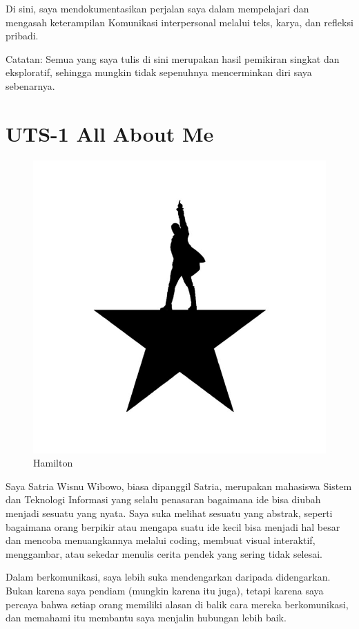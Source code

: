 \documentclass[
  letterpaper,
  DIV=11,
  numbers=noendperiod]{scrreprt}
\begin{document}
Di sini, saya mendokumentasikan perjalan saya dalam mempelajari dan
mengasah keterampilan Komunikasi interpersonal melalui teks, karya, dan
refleksi pribadi.

Catatan: Semua yang saya tulis di sini merupakan hasil pemikiran singkat
dan eksploratif, sehingga mungkin tidak sepenuhnya mencerminkan diri
saya sebenarnya.


\chapter{UTS-1 All About Me}\label{uts-1-all-about-me}

\begin{figure}[H]

{\centering \includegraphics[width=0.5\linewidth,height=\textheight,keepaspectratio]{All_About_me/../images/HamiltonLogo.jpg}

}

\caption{Hamilton}

\end{figure}%

Saya Satria Wisnu Wibowo, biasa dipanggil Satria, merupakan mahasiswa
Sistem dan Teknologi Informasi yang selalu penasaran bagaimana ide bisa
diubah menjadi sesuatu yang nyata. Saya suka melihat sesuatu yang
abstrak, seperti bagaimana orang berpikir atau mengapa suatu ide kecil
bisa menjadi hal besar dan mencoba menuangkannya melalui coding, membuat
visual interaktif, menggambar, atau sekedar menulis cerita pendek yang
sering tidak selesai.

Dalam berkomunikasi, saya lebih suka mendengarkan daripada didengarkan.
Bukan karena saya pendiam (mungkin karena itu juga), tetapi karena saya
percaya bahwa setiap orang memiliki alasan di balik cara mereka
berkomunikasi, dan memahami itu membantu saya menjalin hubungan lebih
baik.
\end{document}
